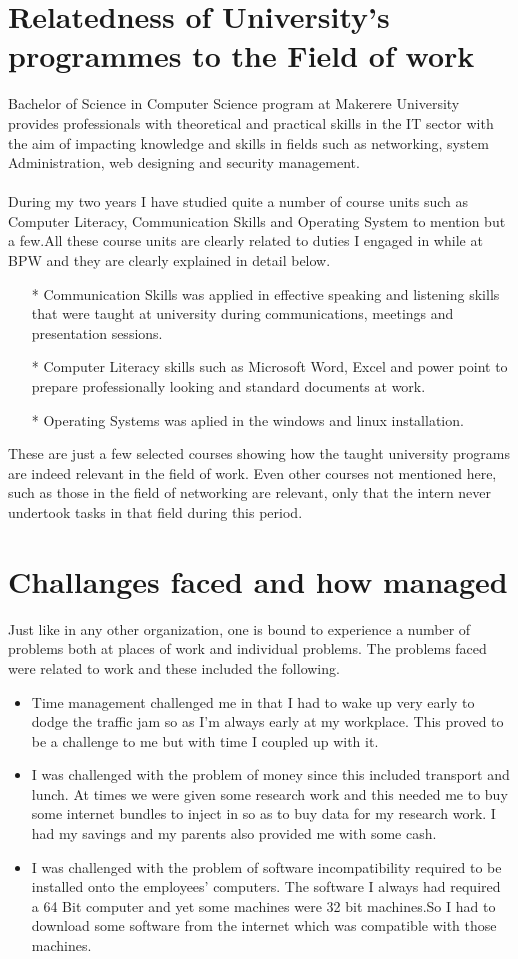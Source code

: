 \section{Relatedness of University's programmes to the Field of work}
Bachelor of Science in Computer Science program at Makerere University provides
professionals with theoretical and practical skills in the IT sector with the aim of
impacting knowledge and skills in fields such as networking, system Administration,
web designing and security management.\\ \\
During my two years I have studied quite a number of course units such as Computer
Literacy, Communication Skills and Operating System to mention but a few.All these course units are clearly related to duties I engaged in while at BPW and they are clearly explained in detail below.
\begin{itemize}
\item[*] Communication Skills was applied in effective speaking and listening skills that were taught at university  during  communications,  meetings  and  presentation sessions.
\item[*] Computer Literacy  skills  such as Microsoft Word, Excel and power point  to  prepare  professionally  looking  and  standard documents at work.
\item[*] Operating Systems was aplied in the windows and linux installation. 

\end{itemize}
These are just a few selected courses showing how the taught university programs are indeed relevant in the field of work. Even other courses not mentioned here, such as those in the field of networking are relevant, only that the intern never undertook tasks in that field during this period.
\section{Challanges faced and how managed}
Just like in any other organization, one is bound to experience a number of problems both at places of work and individual problems. The problems faced were related to work and these included the following.
\begin{itemize}
\item Time management challenged me in that I had to wake up very early to dodge the traffic jam so as I’m always early at my workplace. This proved to be a challenge to me but with time I coupled up with it.
\item I was challenged with the problem of money since this included transport and lunch. At times we were given some research work and this needed me to buy some internet bundles to inject in so as to buy data for my research work. I had my savings and my parents also provided me with some cash.
\item I was challenged with the problem of software incompatibility required to be installed onto the employees' computers. The software I always had required a 64 Bit computer and yet some machines were 32 bit machines.So I had to download some software from the internet which was compatible with those machines.
\end{itemize}
